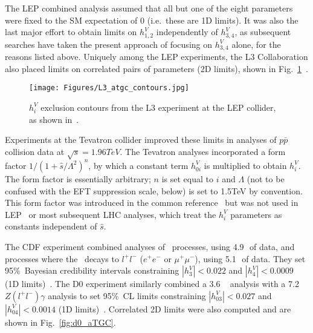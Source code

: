 The LEP combined analysis assumed that all but one of the eight parameters were fixed to the SM expectation of 0 (i.e.\ these are 1D limits).
It was also the last major effort to obtain limits on $h_{1,2}^{V}$ independently of $h_{3,4}^{V}$,
as subsequent searches have taken the present approach of focusing on $h_{3,4}^{V}$ alone, for the reasons listed above.
Uniquely among the LEP experiments, the L3 Collaboration also placed limits on correlated pairs of parameters (2D limits), shown in Fig.~\ref{fig:L3_atgc_contours}~\cite{ref:j.physletb.2004.07.002}.

\begin{figure}[hbtp]
  \begin{center}
    \texttt{[image: Figures/L3\_atgc\_contours.jpg]}
    \caption{
      $h_{i}^{V}$ exclusion contours from the L3 experiment at the LEP collider, as shown in~\cite{ref:j.physletb.2004.07.002}.
    }
    \label{fig:L3_atgc_contours}
  \end{center}
\end{figure}

Experiments at the Tevatron collider improved these limits in analyses of $p\bar{p}$ collision data at $\sqrt{s} = 1.96\unit{TeV}$.
The Tevatron analyses incorporated a form factor $1 / (1 + \hat{s}/\Lambda^{2})^{n}$, by which a constant term $h_{0i}^{V}$ is
multiplied to obtain $h_{i}^{V}$.
The form factor is essentially arbitrary; $n$ is set equal to $i$ and $\Lambda$ (not to be confused with the EFT suppression scale, below)
is set to 1.5\unit{TeV} by convention. This form factor was introduced in the common reference~\cite{ref:PhysRevD.47.4889} but was not used in LEP~\cite{ref:j.physrep.2013.07.004}
or most subsequent LHC analyses, which treat the $h_{i}^{V}$ parameters as constants independent of $\hat{s}$.

The CDF experiment combined analyses of \zinvg\ processes, using 4.9\,\fbinv\ of data, and processes where the \PZ\ decays to
$l^\mathrm{+}l^\mathrm{-}$ ($e^\mathrm{+}e^\mathrm{-}$ or $\mu^\mathrm{+}\mu^\mathrm{-}$), using 5.1\,\fbinv\ of data.
They set 95\%\ Bayesian credibility intervals constraining $|h_{3}^{V}| < 0.022$ and $|h_{4}^{V}| < 0.0009$ (1D limits)~\cite{ref:PhysRevLett.107.051802}.
The D0 experiment similarly combined a 3.6\,\fbinv\ \zinvg\ analysis with a 7.2
\fbinv\ $Z(l^\mathrm{+}l^\mathrm{-})\gamma$ analysis to set 95\%\ CL limits constraining
$|h_{03}^{V}| < 0.027$ and $|h_{04}^{V}| < 0.0014$ (1D limits)~\cite{ref:PhysRevD.85.052001}. Correlated 2D limits were also
computed and are shown in Fig.~\ref{fig:d0_aTGC}.

